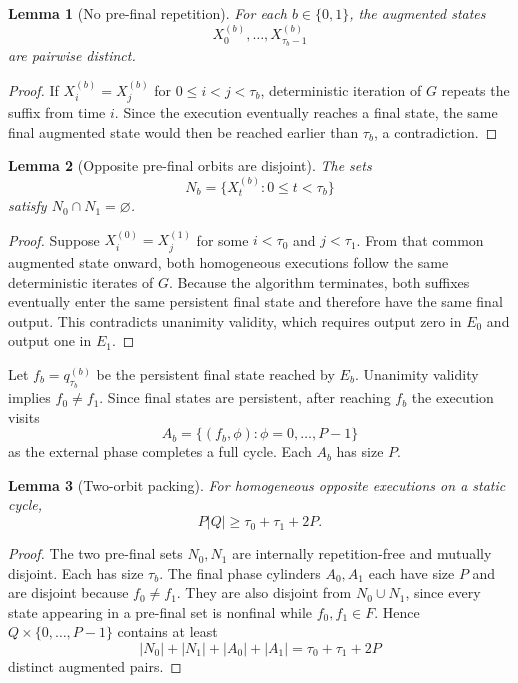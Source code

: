 \documentclass[11pt]{article}
\newtheorem{lemma}{Lemma}
\theoremstyle{remark}
\begin{document}
\begin{lemma}[No pre-final repetition]
For each $b\in\{0,1\}$, the augmented states
\[
X_0^{(b)},\ldots,X_{\tau_b-1}^{(b)}
\]
are pairwise distinct.
\end{lemma}

\begin{proof}
If $X_i^{(b)}=X_j^{(b)}$ for $0\le i<j<\tau_b$, deterministic iteration of $G$ repeats the suffix from time $i$.  Since the execution eventually reaches a final state, the same final augmented state would then be reached earlier than $\tau_b$, a contradiction.
\end{proof}

\begin{lemma}[Opposite pre-final orbits are disjoint]
The sets
\[
N_b=\{X_t^{(b)}:0\le t<\tau_b\}
\]
satisfy $N_0\cap N_1=\varnothing$.
\end{lemma}

\begin{proof}
Suppose $X_i^{(0)}=X_j^{(1)}$ for some $i<\tau_0$ and $j<\tau_1$.  From that common augmented state onward, both homogeneous executions follow the same deterministic iterates of $G$.  Because the algorithm terminates, both suffixes eventually enter the same persistent final state and therefore have the same final output.  This contradicts unanimity validity, which requires output zero in $E_0$ and output one in $E_1$.
\end{proof}

Let $f_b=q_{\tau_b}^{(b)}$ be the persistent final state reached by $E_b$.  Unanimity validity implies $f_0\ne f_1$.  Since final states are persistent, after reaching $f_b$ the execution visits
\[
A_b=\{(f_b,\phi):\phi=0,\ldots,P-1\}
\]
as the external phase completes a full cycle.  Each $A_b$ has size $P$.

\begin{lemma}[Two-orbit packing]
For homogeneous opposite executions on a static cycle,
\[
P|Q|\ge \tau_0+\tau_1+2P.
\]
\end{lemma}

\begin{proof}
The two pre-final sets $N_0,N_1$ are internally repetition-free and mutually disjoint.  Each has size $\tau_b$.  The final phase cylinders $A_0,A_1$ each have size $P$ and are disjoint because $f_0\ne f_1$.  They are also disjoint from $N_0\cup N_1$, since every state appearing in a pre-final set is nonfinal while $f_0,f_1\in F$.  Hence $Q\times\{0,\ldots,P-1\}$ contains at least
\[
|N_0|+|N_1|+|A_0|+|A_1|=\tau_0+\tau_1+2P
\]
distinct augmented pairs.
\end{proof}
\end{document}
